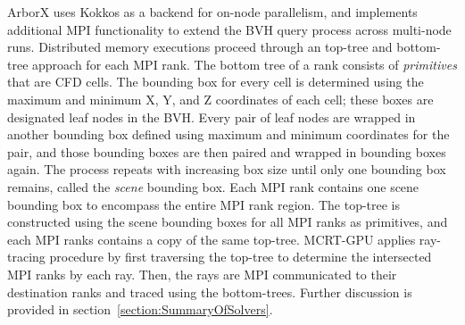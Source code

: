 ArborX uses Kokkos as a backend for on-node parallelism, and implements additional MPI functionality to extend the BVH query process across multi-node runs. Distributed memory executions proceed through an top-tree and bottom-tree approach for each MPI rank. The bottom tree of a rank consists of \textit{primitives} that are CFD cells. The bounding box for every cell is determined using the maximum and minimum X, Y, and Z coordinates of each cell; these boxes are designated leaf nodes in the BVH. 
Every pair of leaf nodes are wrapped in another bounding box defined using maximum and minimum coordinates for the pair, and those bounding boxes are then paired and wrapped in bounding boxes again. The process repeats with increasing box size until only one bounding box remains, called the \textit{scene} bounding box. 
Each MPI rank contains one scene bounding box to encompass the entire MPI rank region. The top-tree is constructed using the scene bounding boxes for all MPI ranks as primitives, and each MPI ranks contains a copy of the same top-tree.
MCRT-GPU applies ray-tracing procedure by first traversing the top-tree to determine the intersected MPI ranks by each ray. Then, the rays are MPI communicated to their destination ranks and traced using the bottom-trees. Further discussion is provided in section~\ref{section:SummaryOfSolvers}.




